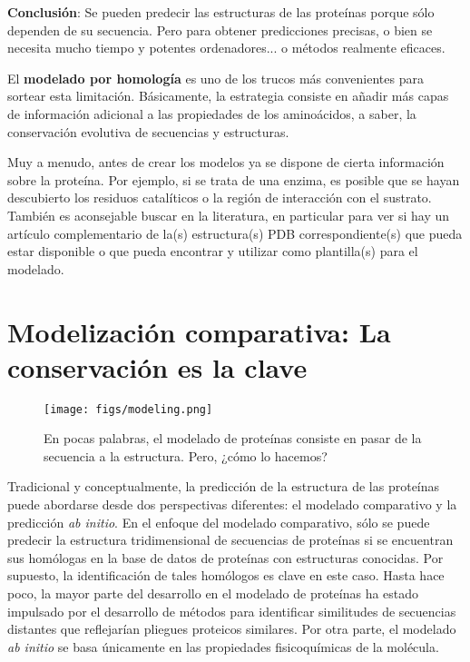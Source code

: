 \begin{table}[htbp]
\begin{mdframed}[backgroundcolor=black!10]
    \centering
    \textbf{Conclusión}: Se pueden predecir las estructuras de las proteínas porque sólo dependen de su secuencia. Pero para obtener predicciones precisas, o bien se necesita mucho tiempo y potentes ordenadores... o métodos realmente eficaces. 
    \end{mdframed}
\end{table}

El \textbf{modelado por homología} es uno de los trucos más convenientes para sortear esta limitación. Básicamente, la estrategia consiste en añadir más capas de información adicional a las propiedades de los aminoácidos, a saber, la conservación evolutiva de secuencias y estructuras.

Muy a menudo, antes de crear los modelos ya se dispone de cierta información sobre la proteína. Por ejemplo, si se trata de una enzima, es posible que se hayan descubierto los residuos catalíticos o la región de interacción con el sustrato. También es aconsejable buscar en la literatura, en particular para ver si hay un artículo complementario de la(s) estructura(s) PDB correspondiente(s) que pueda estar disponible o que pueda encontrar y utilizar como plantilla(s) para el modelado.

\section{Modelización comparativa: La conservación es la clave}
\begin{figure}[h]
\centering
\texttt{[image: figs/modeling.png]}
\caption{En pocas palabras, el modelado de proteínas consiste en pasar de la secuencia a la estructura. Pero, ¿cómo lo hacemos?}
\end{figure}

Tradicional y conceptualmente, la predicción de la estructura de las proteínas puede abordarse desde dos perspectivas diferentes: el modelado comparativo y la predicción \textit{ab initio}. En el enfoque del modelado comparativo, sólo se puede predecir la estructura tridimensional de secuencias de proteínas si se encuentran sus homólogas en la base de datos de proteínas con estructuras conocidas. Por supuesto, la identificación de tales homólogos es clave en este caso. Hasta hace poco, la mayor parte del desarrollo en el modelado de proteínas ha estado impulsado por el desarrollo de métodos para identificar similitudes de secuencias distantes que reflejarían pliegues proteicos similares. Por otra parte, el modelado \textit{ab initio} se basa únicamente en las propiedades fisicoquímicas de la molécula.

